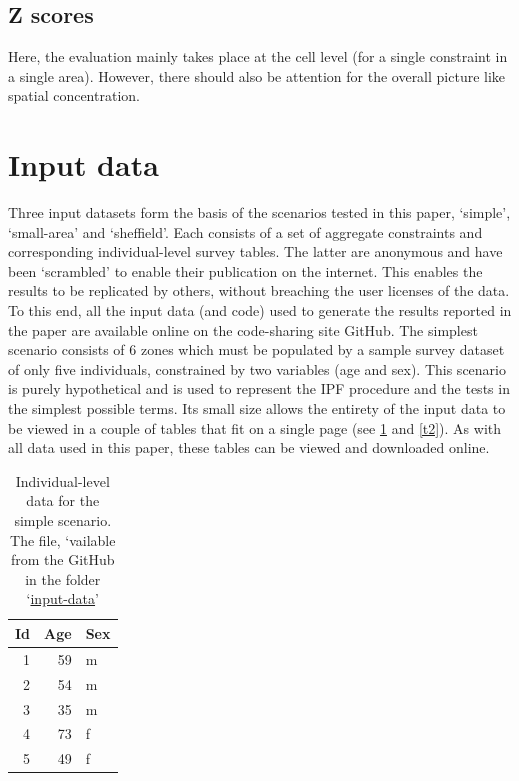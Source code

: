 \documentclass[a4paper,10pt]{article}
\begin{document}
\subsection{Z scores}
Here, the evaluation mainly takes place at the cell level (for a single constraint in a single area).
However, there should also be attention for the overall picture like spatial concentration.


\section{Input data}
Three input datasets form the basis of the scenarios tested in this paper,
`simple', `small-area' and `sheffield'. Each consists of a set of aggregate
constraints and corresponding individual-level survey tables.
The latter are anonymous and have been `scrambled' to enable their
publication on the internet. This enables the results to be replicated by others,
without breaching the user licenses of the data.
To this end, all the input data (and code) used to generate the results reported
in the paper are available online on the code-sharing site GitHub.
The simplest scenario consists of 6 zones which must be populated by a
sample survey dataset of only five individuals, constrained by two variables (age and sex).
This scenario is purely hypothetical and is used to represent the IPF procedure
and the tests in the simplest possible terms. Its small size allows the entirety
of the input data to be viewed in a couple of tables that fit on a single page
(see \cref{t1} and \cref{t2}). As with all data used in this paper, these tables can be
viewed and downloaded online.

\begin{table}[htbp]
\caption{Individual-level data for the simple scenario. The file, `vailable from the GitHub in the folder 
`\href{https://github.com/Robinlovelace/IPF-performance-testing/tree/master/input-data/small-area-eg}{input-data}'} %
\begin{center}
\begin{tabular}{rrl}
\toprule
\multicolumn{1}{l}{Id} & \multicolumn{1}{l}{Age} & Sex \\
\midrule
1 & 59 & m \\
2 & 54 & m \\
3 & 35 & m \\
4 & 73 & f \\
5 & 49 & f \\
\bottomrule
\end{tabular}
\end{center}
\label{t1}
\end{table}
\end{document}
